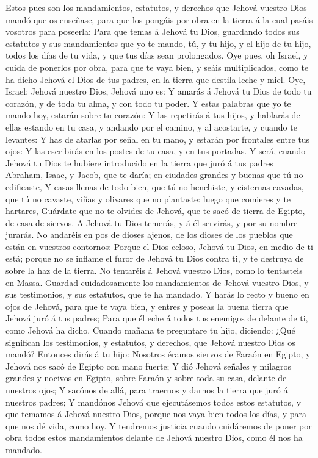 Estos pues son los mandamientos, estatutos, y derechos
que Jehová vuestro Dios mandó que os enseñase, para que los pongáis por
obra en la tierra á la cual pasáis vosotros para poseerla:
 Para que temas á Jehová tu Dios, guardando todos sus
estatutos y sus mandamientos que yo te mando, tú, y tu hijo, y el hijo
de tu hijo, todos los días de tu vida, y que tus días sean prolongados.
 Oye pues, oh Israel, y cuida de ponerlos por obra, para
que te vaya bien, y seáis multiplicados, como te ha dicho Jehová el Dios
de tus padres, en la tierra que destila leche y miel. 
Oye, Israel: Jehová nuestro Dios, Jehová uno es:  Y amarás
á Jehová tu Dios de todo tu corazón, y de toda tu alma, y con todo tu
poder.  Y estas palabras que yo te mando hoy, estarán
sobre tu corazón:  Y las repetirás á tus hijos, y hablarás
de ellas estando en tu casa, y andando por el camino, y al acostarte, y
cuando te levantes:  Y has de atarlas por señal en tu
mano, y estarán por frontales entre tus ojos:  Y las
escribirás en los postes de tu casa, y en tus portadas. 
Y será, cuando Jehová tu Dios te hubiere introducido en la tierra que
juró á tus padres Abraham, Isaac, y Jacob, que te daría; en ciudades
grandes y buenas que tú no edificaste,  Y casas llenas de
todo bien, que tú no henchiste, y cisternas cavadas, que tú no cavaste,
viñas y olivares que no plantaste: luego que comieres y te hartares,
 Guárdate que no te olvides de Jehová, que te sacó de
tierra de Egipto, de casa de siervos.  A Jehová tu Dios
temerás, y á él servirás, y por su nombre jurarás.  No
andaréis en pos de dioses ajenos, de los dioses de los pueblos que están
en vuestros contornos:  Porque el Dios celoso, Jehová tu
Dios, en medio de ti está; porque no se inflame el furor de Jehová tu
Dios contra ti, y te destruya de sobre la haz de la tierra.
 No tentaréis á Jehová vuestro Dios, como lo tentasteis
en Massa.  Guardad cuidadosamente los mandamientos de
Jehová vuestro Dios, y sus testimonios, y sus estatutos, que te ha
mandado.  Y harás lo recto y bueno en ojos de Jehová,
para que te vaya bien, y entres y poseas la buena tierra que Jehová juró
á tus padres;  Para que él eche á todos tus enemigos de
delante de ti, como Jehová ha dicho.  Cuando mañana te
preguntare tu hijo, diciendo: ¿Qué significan los testimonios, y
estatutos, y derechos, que Jehová nuestro Dios os mandó? 
Entonces dirás á tu hijo: Nosotros éramos siervos de Faraón en Egipto, y
Jehová nos sacó de Egipto con mano fuerte;  Y dió Jehová
señales y milagros grandes y nocivos en Egipto, sobre Faraón y sobre
toda su casa, delante de nuestros ojos;  Y sacónos de
allá, para traernos y darnos la tierra que juró á nuestros padres;
 Y mandónos Jehová que ejecutásemos todos estos
estatutos, y que temamos á Jehová nuestro Dios, porque nos vaya bien
todos los días, y para que nos dé vida, como hoy.  Y
tendremos justicia cuando cuidáremos de poner por obra todos estos
mandamientos delante de Jehová nuestro Dios, como él nos ha mandado.

